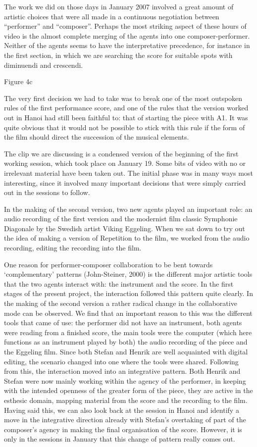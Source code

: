 The work we did on those days in January 2007 involved a great amount
of artistic choices that were all made in a continuous negotiation
between ``performer'' and ``composer''. Perhaps the most striking
aspect of these hours of video is the almost complete merging of the
agents into one composer-performer. Neither of the agents seems to
have the interpretative precedence, for instance in the first section,
in which we are searching the score for suitable spots with diminuendi
and crescendi.
 

Figure 4c
 

The very first decision we had to take was to break one of the most
outspoken rules of the first performance score, and one of the rules
that the version worked out in Hanoi had still been faithful to: that
of starting the piece with A1. It was quite obvious that it would not
be possible to stick with this rule if the form of the film should
direct the succession of the musical elements.
 
The clip we are discussing is a condensed version of the beginning of
the first working session, which took place on January 19. Some bits
of video with no or irrelevant material have been taken out. The
initial phase was in many ways most interesting, since it involved
many important decisions that were simply carried out in the sessions
to follow.
 
In the making of the second version, two new agents played an
important role: an audio recording of the first version and the
modernist film classic Symphonie Diagonale by the Swedish artist
Viking Eggeling. When we sat down to try out the idea of making a
version of Repetition to the film, we worked from the audio recording,
editing the recording into the film.

One reason for performer-composer collaboration to be bent towards
`complementary' patterns (John-Steiner, 2000) is the different major
artistic tools that the two agents interact with: the instrument and
the score. In the first stages of the present project, the interaction
followed this pattern quite clearly. In the making of the second
version a rather radical change in the collaborative mode can be
observed. We find that an important reason to this was the different
tools that came of use: the performer did not have an instrument, both
agents were reading from a finished score, the main tools were the
computer (which here functions as an instrument played by both) the
audio recording of the piece and the Eggeling film. Since both Stefan
and Henrik are well acquainted with digital editing, the scenario
changed into one where the tools were shared. Following from this, the
interaction moved into an integrative pattern. Both Henrik and Stefan
were now mainly working within the agency of the performer, in keeping
with the intended openness of the greater form of the piece, they are
active in the esthesic domain, mapping material from the score and the
recording to the film. Having said this, we can also look back at the
session in Hanoi and identify a move in the integrative direction
already with Stefan's overtaking of part of the composer's agency in
making the final organisation of the score. However, it is only in the
sessions in January that this change of pattern really comes out.
 
